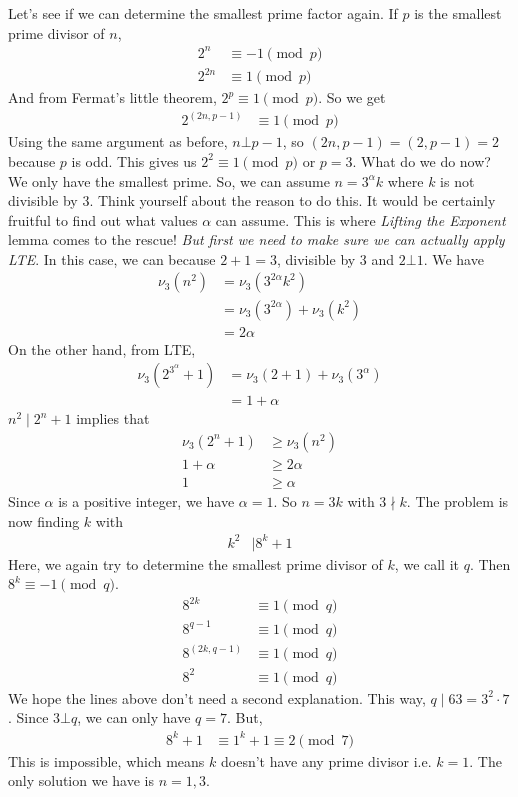 \begin{solution}
	Let's see if we can determine the smallest prime factor again. If $p$ is the smallest prime divisor of $n$,
		\begin{align*}
			2^n &\equiv-1\pmod p\\
			2^{2n} &\equiv1\pmod p
		\end{align*}
	And from Fermat's little theorem, $2^p\equiv1\pmod p$. So we get
		\begin{align*}
			2^{(2n,p-1)} &\equiv1\pmod p
		\end{align*}
	Using the same argument as before, $n\bot p-1$, so $(2n,p-1)=(2,p-1)=2$ because $p$ is odd. This gives us $2^2\equiv1\pmod p$ or $p=3$. What do we do now? We only have the smallest prime. So, we can assume $n=3^\alpha k$ where $k$ is not divisible by $3$. Think yourself about the reason to do this. It would be certainly fruitful to find out what values $\alpha$ can assume. This is where \textit{Lifting the Exponent} lemma comes to the rescue! \textit{But first we need to make sure we can actually apply LTE}. In this case, we can because $2+1=3$, divisible by $3$ and $2\bot1$. We have
		\begin{align*}
			\nu_3(n^2)  & = \nu_3(3^{2\alpha }k^2)\\
						& = \nu_3(3^{2\alpha })+\nu_3(k^2)\\
						& = 2\alpha
		\end{align*}
	On the other hand, from LTE,
		\begin{align*}
			\nu_3(2^{3^\alpha}+1)  & = \nu_3(2+1)+\nu_3(3^\alpha )\\
								& = 1+\alpha
		\end{align*}
	$n^2\mid 2^n+1$ implies that
		\begin{align*}
			\nu_3(2^n+1) & \geq\nu_3(n^2)\\
			1+\alpha & \geq2\alpha\\
			1 & \geq\alpha
		\end{align*}
	Since $\alpha $ is a positive integer, we have $\alpha = 1$. So $n=3k$ with $3\nmid k$. The problem is now finding $k$ with
		\begin{align*}
			k^2 & \mid  8^k+1
		\end{align*}
	Here, we again try to determine the smallest prime divisor of $k$, we call it $q$. Then $8^k\equiv-1\pmod q$.
		\begin{align*}
			8^{2k} &\equiv1\pmod q\\
			8^{q-1}&\equiv1\pmod q\\
			8^{(2k,q-1)}&\equiv1\pmod q\\
			8^{2}&\equiv1\pmod q
		\end{align*}
	We hope the lines above don't need a second explanation. This way, $q\mid 63=3^2\cdot7$. Since $3\bot q$, we can only have $q=7$. But,
		\begin{align*}
			8^k+1 &\equiv1^k+1\equiv2\pmod7
		\end{align*}
	This is impossible, which means $k$ doesn't have any prime divisor i.e. $k=1$. The only solution we have is $n=1,3$.
\end{solution}

